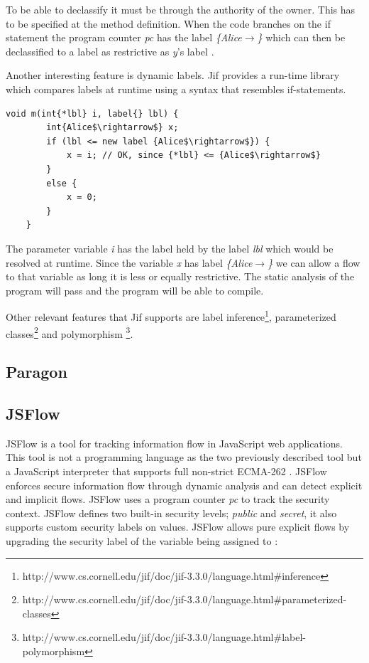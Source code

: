 To be able to declassify it must be through the authority of the owner. This has to be specified at the method definition. When the code branches on the if statement the program counter \emph{pc} has the label \emph{\{Alice$\rightarrow$\}} which can then be declassified to a label as restrictive as \emph{y}'s label \cite{jifmanual} \cite{Srikant}.

Another interesting feature is dynamic labels. Jif provides a run-time library which compares labels at runtime using a syntax that resembles if-statements.
\begin{lstlisting}[mathescape]
	void m(int{*lbl} i, label{} lbl) {
		int{Alice$\rightarrow$} x;
		if (lbl <= new label {Alice$\rightarrow$}) {
			x = i; // OK, since {*lbl} <= {Alice$\rightarrow$}
		}
		else {
			x = 0;
		}
	}
\end{lstlisting}

The parameter variable \emph{i} has the label held by the label \emph{lbl} which would be resolved at runtime. Since the variable \emph{x} has label \emph{\{Alice$\rightarrow$\}} we can allow a flow to that variable as long it is less or equally restrictive. The static analysis of the program will pass and the program will be able to compile.  


Other relevant features that Jif supports are label inference\footnote{http://www.cs.cornell.edu/jif/doc/jif-3.3.0/language.html\#inference}, parameterized classes\footnote{http://www.cs.cornell.edu/jif/doc/jif-3.3.0/language.html\#parameterized-classes} and polymorphism \footnote{http://www.cs.cornell.edu/jif/doc/jif-3.3.0/language.html\#label-polymorphism}.

\subsection{Paragon}







\subsection{JSFlow}

JSFlow is a tool for tracking information flow in JavaScript web applications. This tool is not a programming language as the two previously described tool but a JavaScript interpreter that supports full non-strict ECMA-262 \cite{jsflowsite}. JSFlow enforces secure information flow through dynamic analysis and can detect explicit and implicit flows. JSFlow uses a program counter \emph{pc} to track the security context. JSFlow defines two built-in security levels; \emph{public} and \emph{secret}, it also supports custom security labels on values. JSFlow allows pure explicit flows by upgrading the security label of the variable being assigned to \cite{jsflowsite}:

